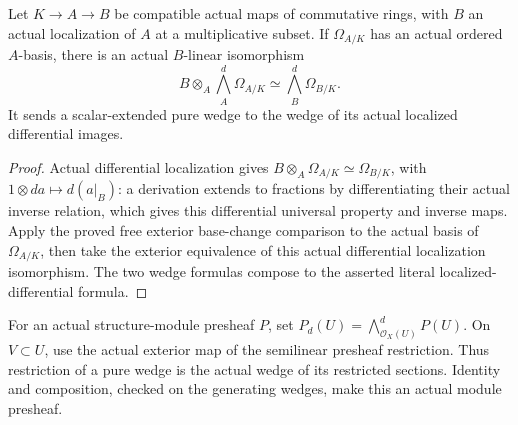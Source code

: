 \begin{corollary}
\label{sc0-canonical-port:ext:free-differential-principal-open}
\leanok
Let \(K\to A\to B\) be compatible actual maps of
commutative rings, with \(B\) an actual localization
of \(A\) at a multiplicative subset. If \(\Omega_{A/K}\)
has an actual ordered \(A\)-basis, there is an actual
\(B\)-linear isomorphism
\[
 B\otimes_A\bigwedge_A^d\Omega_{A/K}
 \simeq\bigwedge_B^d\Omega_{B/K}.
\]
It sends a scalar-extended pure wedge to the wedge
of its actual localized differential images.
\end{corollary}
\begin{proof}
Actual differential localization gives
\(B\otimes_A\Omega_{A/K}\simeq\Omega_{B/K}\),
with \(1\otimes da\mapsto d(a|_B)\): a derivation
extends to fractions by differentiating their actual
inverse relation, which gives this differential
universal property and inverse maps. Apply the proved
free exterior base-change comparison to the actual
basis of \(\Omega_{A/K}\), then take the exterior
equivalence of this actual differential localization
isomorphism. The two wedge formulas compose to the
asserted literal localized-differential formula.
\end{proof}

\begin{definition}
\label{sc0-canonical-port:ext:exterior-presheaf}
\leanok
For an actual structure-module presheaf \(P\), set
\(P_d(U)=\bigwedge_{\mathcal O_X(U)}^dP(U)\).
On \(V\subset U\), use the actual exterior map of
the semilinear presheaf restriction. Thus restriction
of a pure wedge is the actual wedge of its restricted
sections. Identity and composition, checked on the
generating wedges, make this an actual module presheaf.
\end{definition}

